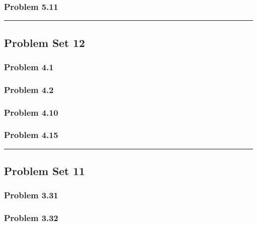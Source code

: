 \documentclass[11pt]{article}
\begin{document}
\subsubsection{Problem 5.11}\label{problem-5.11}

\begin{center}\rule{0.5\linewidth}{0.5pt}\end{center}

    \subsection{Problem Set 12}\label{problem-set-12}

\subsubsection{Problem 4.1}\label{problem-4.1}

\subsubsection{Problem 4.2}\label{problem-4.2}

\subsubsection{Problem 4.10}\label{problem-4.10}

\subsubsection{Problem 4.15}\label{problem-4.15}

\begin{center}\rule{0.5\linewidth}{0.5pt}\end{center}

    \subsection{Problem Set 11}\label{problem-set-11}

\subsubsection{Problem 3.31}\label{problem-3.31}

\subsubsection{Problem 3.32}\label{problem-3.32}
\end{document}
